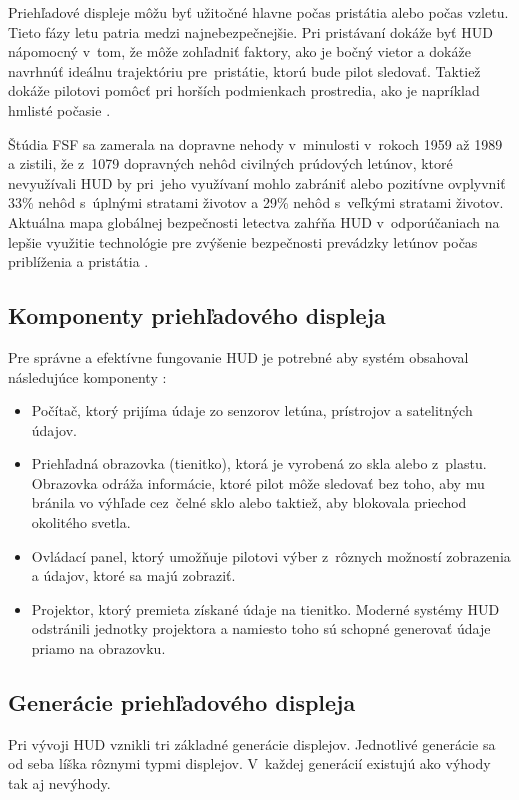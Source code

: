 Priehľadové displeje môžu byť užitočné hlavne počas pristátia alebo počas vzletu. Tieto fázy letu patria medzi najnebezpečnejšie. Pri pristávaní dokáže byť HUD nápomocný v~tom, že môže zohľadniť faktory, ako je bočný vietor a dokáže navrhnúť ideálnu trajektóriu pre~pristátie, ktorú bude pilot sledovať. Taktiež dokáže pilotovi pomôcť pri horších podmienkach prostredia, ako je napríklad hmlisté počasie \cite{HUDnight}.

Štúdia FSF sa zamerala na dopravne nehody v~minulosti v~rokoch 1959 až 1989 a zistili, že z~1079 dopravných nehôd civilných prúdových letúnov, ktoré nevyužívali HUD by pri~jeho využívaní mohlo zabrániť alebo pozitívne ovplyvniť 33\% nehôd s~úplnými stratami životov a 29\% nehôd s~veľkými stratami životov. Aktuálna mapa globálnej bezpečnosti letectva zahŕňa HUD v~odporúčaniach na lepšie využitie technológie pre zvýšenie bezpečnosti prevádzky letúnov počas priblíženia a pristátia \cite{SafetyHUD}.

\subsection{Komponenty priehľadového displeja}
Pre správne a efektívne fungovanie HUD je potrebné aby systém obsahoval následujúce komponenty \cite{HUDkomponenty}:
\begin{itemize}
    \item Počítač, ktorý prijíma údaje zo senzorov letúna, prístrojov a satelitných údajov.
    \item Priehľadná obrazovka (tienitko), ktorá je vyrobená zo skla alebo z~plastu. Obrazovka odráža informácie, ktoré pilot môže sledovať bez toho, aby mu bránila vo výhľade cez~čelné sklo alebo taktiež, aby blokovala priechod okolitého svetla.
    \item Ovládací panel, ktorý umožňuje pilotovi výber z~rôznych možností zobrazenia a údajov, ktoré sa majú zobraziť.
    \item Projektor, ktorý premieta získané údaje na tienitko. Moderné systémy HUD odstránili jednotky projektora a namiesto toho sú schopné generovať údaje priamo na obrazovku.
\end{itemize}

\subsection{Generácie priehľadového displeja}
Pri vývoji HUD vznikli tri základné generácie displejov. Jednotlivé generácie sa od seba líška rôznymi typmi displejov. V~každej generácií existujú ako výhody tak aj nevýhody.
